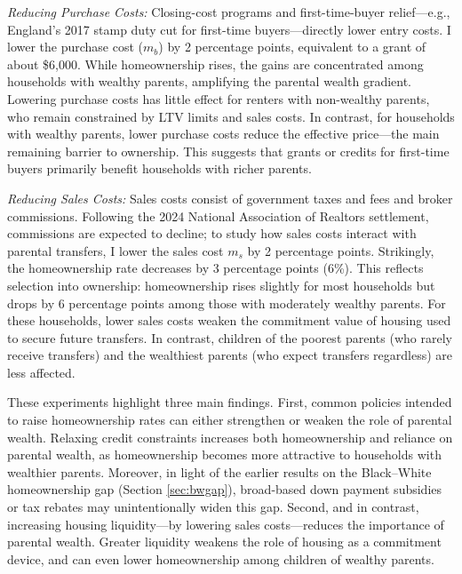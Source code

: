 \documentclass[12pt]{article}
\begin{document}
\textit{Reducing Purchase Costs:}
Closing-cost programs and first-time-buyer relief---e.g., England’s 2017 stamp duty cut for first-time buyers---directly lower entry costs. I lower the purchase cost ($m_b$) by 2 percentage points, equivalent to a grant of about \$6,000. While homeownership rises, the gains are concentrated among households with wealthy parents, amplifying the parental wealth gradient. Lowering purchase costs has little effect for renters with non-wealthy parents, who remain constrained by LTV limits and sales costs. In contrast, for households with wealthy parents, lower purchase costs reduce the effective price---the main remaining barrier to ownership. This suggests that grants or credits for first-time buyers primarily benefit households with richer parents.
 
\textit{Reducing Sales Costs:} 
Sales costs consist of government taxes and fees and broker commissions. Following the 2024 National Association of Realtors settlement, commissions are expected to decline; to study how sales costs interact with parental transfers, I lower the sales cost $m_s$ by 2 percentage points. Strikingly, the homeownership rate decreases by 3 percentage points (6\%). This reflects selection into ownership: homeownership rises slightly for most households but drops by 6 percentage points among those with moderately wealthy parents. For these households, lower sales costs weaken the commitment value of housing used to secure future transfers. In contrast, children of the poorest parents (who rarely receive transfers) and the wealthiest parents (who expect transfers regardless) are less affected.


\begin{table}[tb]
	\centering
\end{table}

These experiments highlight three main findings. First, common policies intended to raise homeownership rates can either strengthen or weaken the role of parental wealth. Relaxing credit constraints increases both homeownership and reliance on parental wealth, as homeownership becomes more attractive to households with wealthier parents. Moreover, in light of the earlier results on the Black–White homeownership gap (Section \ref{sec:bwgap}), broad-based down payment subsidies or tax rebates may unintentionally widen this gap. Second, and in contrast, increasing housing liquidity---by lowering sales costs---reduces the importance of parental wealth. Greater liquidity weakens the role of housing as a commitment device, and can even lower homeownership among children of wealthy parents. 
\end{document}
